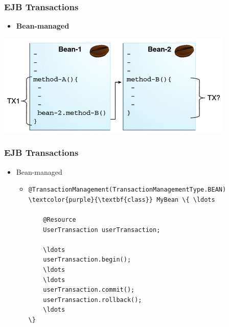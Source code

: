 \documentclass[10pt,xcolor=pdflatex]{beamer}
\begin{document}
\begin{frame}[fragile]\frametitle{EJB Transactions}
 	\begin{itemize}
        \item \textbf{Bean-managed}
          \begin{itemize}
          \end{itemize}
    \end{itemize}
    \medskip
    \includegraphics[scale=.7]{img/obr3}
\end{frame}



\begin{frame}[fragile]\frametitle{EJB Transactions}
  \begin{itemize}
  	\item Bean-managed
    \begin{itemize}
    	\item[]
        	\begin{Verbatim}[fontsize=\footnotesize, commandchars=\\\{\}]
@TransactionManagement(TransactionManagementType.BEAN)
\textcolor{purple}{\textbf{class}} MyBean \{ \ldots 

    @Resource
    UserTransaction userTransaction;

    \ldots
    userTransaction.begin();
    \ldots
    \ldots
    userTransaction.commit();
    userTransaction.rollback();
    \ldots
\}
            \end{Verbatim}
    \end{itemize}
  \end{itemize}
\end{frame}
\end{document}
